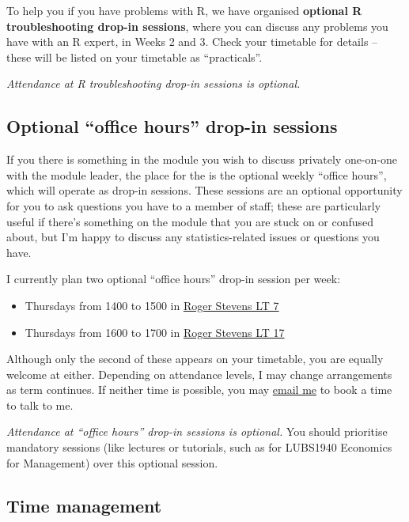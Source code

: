 \documentclass[
  letterpaper,
  DIV=11,
  numbers=noendperiod]{scrreprt}
\providecommand{\tightlist}{%
  \setlength{\itemsep}{0pt}\setlength{\parskip}{0pt}}\usepackage{longtable,booktabs,array}
\theoremstyle{remark}
\begin{document}
To help you if you have problems with R, we have organised
\textbf{optional R troubleshooting drop-in sessions}, where you can
discuss any problems you have with an R expert, in Weeks 2 and 3. Check
your timetable for details -- these will be listed on your timetable as
``practicals''.

\emph{Attendance at R troubleshooting drop-in sessions is optional.}

\hypertarget{dropin}{%
\subsection*{Optional ``office hours'' drop-in sessions}\label{dropin}}

If you there is something in the module you wish to discuss privately
one-on-one with the module leader, the place for the is the optional
weekly ``office hours'', which will operate as drop-in sessions. These
sessions are an optional opportunity for you to ask questions you have
to a member of staff; these are particularly useful if there's something
on the module that you are stuck on or confused about, but I'm happy to
discuss any statistics-related issues or questions you have.

I currently plan two optional ``office hours'' drop-in session per week:

\begin{itemize}
\tightlist
\item
  Thursdays from 1400 to 1500 in
  \href{https://students.leeds.ac.uk/rooms?type=room\&id=100031}{Roger
  Stevens LT 7}
\item
  Thursdays from 1600 to 1700 in
  \href{https://students.leeds.ac.uk/rooms?type=room\&id=100041}{Roger
  Stevens LT 17}
\end{itemize}

Although only the second of these appears on your timetable, you are
equally welcome at either. Depending on attendance levels, I may change
arrangements as term continues. If neither time is possible, you may
\href{mailto:m.aldridge@leeds.ac.uk}{email me} to book a time to talk to
me.

\emph{Attendance at ``office hours'' drop-in sessions is optional.} You
should prioritise mandatory sessions (like lectures or tutorials, such
as for LUBS1940 Economics for Management) over this optional session.

\hypertarget{time}{%
\subsection*{Time management}\label{time}}
\end{document}
